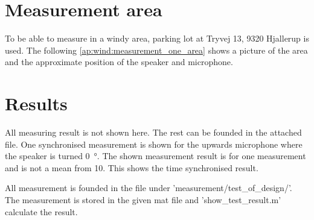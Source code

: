 \section*{Measurement area}
To be able to measure in a windy area, parking lot at Tryvej 13, 9320 Hjallerup is used. The following \autoref{ap:wind:measurement_one_area} shows a picture of the area and the approximate position of the speaker and microphone.


\section*{Results}

All measuring result is not shown here. The rest can be founded in the attached file. One synchronised measurement is shown for the upwards microphone where the speaker is turned \SI{0}{\degree}. The shown measurement result is for one measurement and is not a mean from 10. This shows the time synchronised result. 






All measurement is founded in the file under 'measurement/test_of_design/'. The measurement is stored in the given mat file and 'show_test_result.m' calculate the result.


